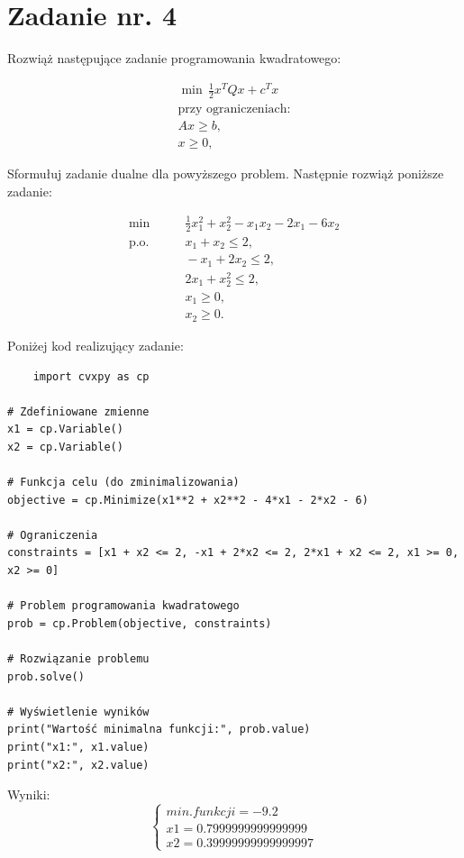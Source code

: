 \documentclass{article}
\begin{document}
\section{Zadanie nr. 4}

Rozwiąż następujące zadanie programowania kwadratowego:


\begin{align*}
\min \, \frac{1}{2}x^TQx + c^Tx \\
\text{przy ograniczeniach:} \\
Ax \ge b, \\
x \ge 0,
\end{align*}

Sformułuj zadanie dualne dla powyższego problem. Następnie rozwiąż poniższe zadanie:

\begin{align*}
    \min &\qquad \frac{1}{2}x_1^2 + x_2^2 - x_1x_2 - 2x_1 - 6x_2 \\
    \text{p.o.} &\qquad x_1 + x_2 \leq 2, \\
    &\qquad -x_1 + 2x_2 \leq 2, \\
    &\qquad 2x_1 + x_2^2 \leq 2, \\
    &\qquad x_1 \geq 0, \\
    &\qquad x_2 \geq 0.
    \end{align*}
    
Poniżej kod realizujący zadanie:

\begin{lstlisting}
    import cvxpy as cp

# Zdefiniowane zmienne
x1 = cp.Variable()
x2 = cp.Variable()

# Funkcja celu (do zminimalizowania)
objective = cp.Minimize(x1**2 + x2**2 - 4*x1 - 2*x2 - 6)

# Ograniczenia
constraints = [x1 + x2 <= 2, -x1 + 2*x2 <= 2, 2*x1 + x2 <= 2, x1 >= 0, x2 >= 0]

# Problem programowania kwadratowego
prob = cp.Problem(objective, constraints)

# Rozwiązanie problemu
prob.solve()

# Wyświetlenie wyników
print("Wartość minimalna funkcji:", prob.value)
print("x1:", x1.value)
print("x2:", x2.value)

\end{lstlisting}

Wyniki:
\begin{equation}
    \begin{cases}
        min. funkcji = -9.2\\
        x1 = 0.7999999999999999\\
        x2 = 0.39999999999999997
    \end{cases}
\end{equation}
\end{document}
